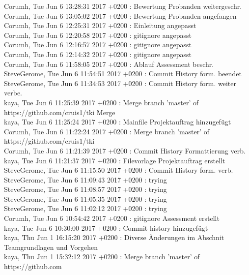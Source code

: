 Corumh, Tue Jun 6 13:28:31 2017 +0200 : Bewertung Probanden weitergeschr. \\
Corumh, Tue Jun 6 13:05:02 2017 +0200 : Bewertung Probanden angefangen \\
Corumh, Tue Jun 6 12:25:31 2017 +0200 : Einleitung angepasst \\
Corumh, Tue Jun 6 12:20:58 2017 +0200 : gitignore angepasst \\
Corumh, Tue Jun 6 12:16:57 2017 +0200 : gitignore angepasst \\
Corumh, Tue Jun 6 12:14:32 2017 +0200 : gitignore angepasst \\
Corumh, Tue Jun 6 11:58:05 2017 +0200 : Ablauf Assessment beschr. \\
SteveGerome, Tue Jun 6 11:54:51 2017 +0200 : Commit History form. beendet \\
SteveGerome, Tue Jun 6 11:34:53 2017 +0200 : Commit History form. weiter verbe. \\
kaya, Tue Jun 6 11:25:39 2017 +0200 : Merge branch 'master' of https://github.com/cruis1/tki Merge \\
kaya, Tue Jun 6 11:25:24 2017 +0200 : Mainfile Projektauftrag hinzugefügt \\
Corumh, Tue Jun 6 11:22:24 2017 +0200 : Merge branch 'master' of https://github.com/cruis1/tki \\
Corumh, Tue Jun 6 11:21:39 2017 +0200 : Commit History Formattierung verb. \\
kaya, Tue Jun 6 11:21:37 2017 +0200 : Filevorlage Projektauftrag erstellt \\
SteveGerome, Tue Jun 6 11:15:50 2017 +0200 : Commit History form. verb. \\
SteveGerome, Tue Jun 6 11:09:43 2017 +0200 : trying \\
SteveGerome, Tue Jun 6 11:08:57 2017 +0200 : trying \\
SteveGerome, Tue Jun 6 11:05:35 2017 +0200 : trying \\
SteveGerome, Tue Jun 6 11:02:12 2017 +0200 : trying \\
Corumh, Tue Jun 6 10:54:42 2017 +0200 : gitignore Assessment erstellt \\
kaya, Tue Jun 6 10:30:00 2017 +0200 : Commit history hinzugefügt \\
kaya, Thu Jun 1 16:15:20 2017 +0200 : Diverse Änderungen im Abschnit Teamgrundlagen und Vorgehen \\
kaya, Thu Jun 1 15:32:12 2017 +0200 : Merge branch 'master' of https://github.com \\
